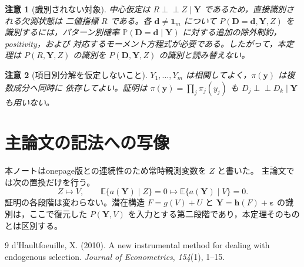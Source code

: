 \documentclass[11pt,a4paper]{article}
\newtheorem{remark}{注意}
\newcommand{\E}{\mathbb E}
\newcommand{\Prb}{\mathbb P}
\newcommand{\1}{\mathbf 1}
\newcommand{\Y}{\bm Y}
\newcommand{\D}{\bm D}
\newcommand{\indep}{\mathrel{\perp\!\!\!\perp}}
\begin{document}
\begin{remark}[識別されない対象]
中心仮定は $R\indep Z\mid\Y$ であるため，直接識別される欠測状態は
二値指標 $R$ である。各 $\bm d\ne\bm 1_m$ について
$P(\D=\bm d,\Y,Z)$ を識別するには，パターン別確率
$\Prb(\D=\bm d\mid\Y)$ に対する追加の除外制約，positivity，および
対応するモーメント方程式が必要である。したがって，本定理は
$P(R,\Y,Z)$ の識別を $P(\D,\Y,Z)$ の識別と読み替えない。
\end{remark}

\begin{remark}[項目別分解を仮定しないこと]
$Y_1,\ldots,Y_m$ は相関してよく，$\pi(\bm y)$ は複数成分へ同時に
依存してよい。証明は $\pi(\bm y)=\prod_j\pi_j(y_j)$ も
$D_j\indep D_k\mid\Y$ も用いない。
\end{remark}

\section{主論文の記法への写像}

本ノートはonepage版との連続性のため常時観測変数を $Z$ と書いた。
主論文では次の置換だけを行う。
\begin{equation}
 Z\longmapsto V,
 \qquad
 \E\{a(\Y)\mid Z\}=0
 \longmapsto
 \E\{a(\Y)\mid V\}=0.
\end{equation}
証明の各段階は変わらない。潜在構造
$F=g(V)+U$ と $\Y=\bm h(F)+\bm\varepsilon$ の識別は，ここで復元した
$P(\Y,V)$ を入力とする第二段階であり，本定理そのものとは区別する。

\begin{thebibliography}{9}
d'Haultfoeuille, X. (2010).
A new instrumental method for dealing with endogenous selection.
\textit{Journal of Econometrics}, \textit{154}(1), 1--15.
\end{thebibliography}
\end{document}
